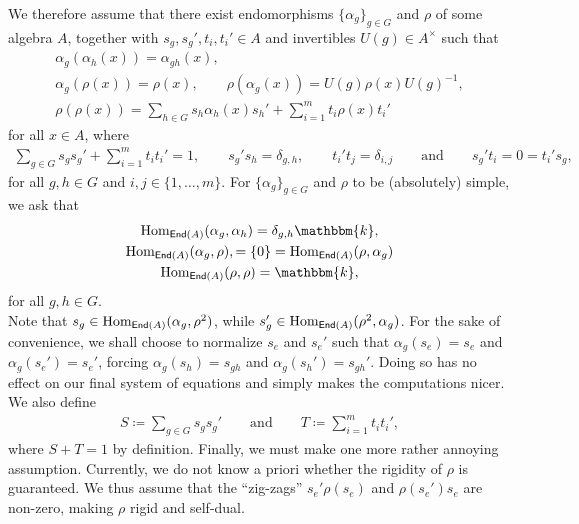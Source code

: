 \noindent We therefore assume that there exist endomorphisms $\{\alpha_g\}_{g \in G}$ and $\rho$ of some algebra $A$, together with $s_g, s_g', t_i, t_i' \in A$ and invertibles $U(g) \in A^\times$ such that %
\begin{gather*}
\alpha_g(\alpha_h(x)) = \alpha_{gh}(x),\\
\alpha_g(\rho(x)) = \rho(x),\qquad\rho(\alpha_g(x)) = U(g)\rho(x)U(g)^{-1},\\
\rho(\rho(x)) = \sum_{h \in G}{s_h\alpha_h(x)s_h'} + \sum_{i=1}^m{t_i\rho(x)t_i'}%
\end{gather*}
\noindent for all $x \in A$, where
\begin{align*}
\sum_{g \in G}{s_gs_g'} + \sum_{i=1}^m{t_it_i'} = 1,\qquad s_g's_h = \delta_{g,h},\qquad t_i't_j = \delta_{i,j}\qquad\text{and}\qquad s_g't_i = 0 = t_i's_g,
\end{align*}
\noindent for all $g, h \in G$ and $i, j \in \{1, \dots, m\}$.  For $\{\alpha_g\}_{g \in G}$ and $\rho$ to be (absolutely) simple, we ask that
\begin{gather*}
\homset_{\textcat{End}(A)}(\alpha_g, \alpha_h) = \delta_{g,h}\mathbbm{k},\\
\homset_{\textcat{End}(A)}(\alpha_g, \rho), = \{0\} = \homset_{\textcat{End}(A)}(\rho, \alpha_g)\\
\homset_{\textcat{End}(A)}(\rho, \rho) = \mathbbm{k},
\end{gather*}
\noindent for all $g, h \in G$.\\

\noindent Note that $s_g \in \textup{Hom}_{\textup{\textsf{End}}(A)}(\alpha_g, \rho^2)$, while $s_g' \in \textup{Hom}_{\textup{\textsf{End}}(A)}(\rho^2, \alpha_g)$. For the sake of convenience, we shall choose to normalize $s_e$ and $s_e'$ such that $\alpha_g(s_e) = s_e$ and $\alpha_g(s_e') = s_e'$, forcing $\alpha_g(s_h) = s_{gh}$ and $\alpha_g(s_h') = s_{gh}'$. Doing so has no effect on our final system of equations and simply makes the computations nicer. We also define
\begin{align*}
S \coloneqq \sum_{g \in G}{s_gs_g'}\qquad\text{and}\qquad T \coloneqq \sum_{i=1}^m{t_it_i'},
\end{align*}
\noindent where $S + T = 1$ by definition. Finally, we must make one more rather annoying assumption. Currently, we do not know a priori whether the rigidity of $\rho$ is guaranteed. We thus assume that the ``zig-zags'' $s_e'\rho(s_e)$ and $\rho(s_e')s_e$ are non-zero, making $\rho$ rigid and self-dual.\\

